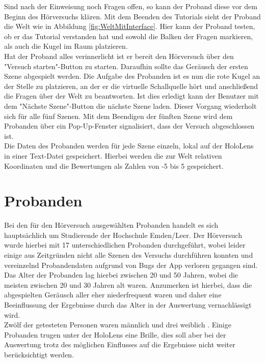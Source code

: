 Sind nach der Einweisung noch Fragen offen, so kann der Proband diese vor dem Beginn des Hörversuchs klären. Mit dem Beenden des Tutorials sieht der Proband die Welt wie in Abbildung \ref{fig:WeltMitInterface}. Hier kann der Proband testen, ob er das Tutorial verstanden hat und sowohl die Balken der Fragen markieren, als auch die Kugel im Raum platzieren.  \\
 
 Hat der Proband alles verinnerlicht ist er bereit den Hörversuch über den "Versuch starten"-Button zu starten. Daraufhin sollte das Geräusch der ersten Szene abgespielt werden. Die Aufgabe des Probanden ist es nun die rote Kugel an der Stelle zu platzieren, an der er die virtuelle Schallquelle hört und anschließend die Fragen über der Welt zu beantworten. Ist dies erledigt kann der Benutzer mit dem "Nächste Szene"-Button die nächste Szene laden. Dieser Vorgang wiederholt sich für alle fünf Szenen. Mit dem Beendigen der fünften Szene wird dem Probanden über ein Pop-Up-Fenster signalisiert, dass der Versuch abgeschlossen ist. \\
 
 Die Daten des Probanden werden für jede Szene  einzeln, lokal auf der HoloLens in einer Text-Datei gespeichert. Hierbei werden die zur Welt relativen Koordinaten und die Bewertungen als Zahlen von -5 bis 5 gespeichert. 
 
 
 \section{Probanden}
 
 Bei den für den Hörversuch ausgewählten Probanden handelt es sich hauptsächlich um Studierende der Hochschule Emden/Leer. Der Hörversuch wurde hierbei mit 17 unterschiedlichen Probanden durchgeführt, wobei leider einige aus Zeitgründen nicht alle Szenen des Versuchs durchführen konnten und vereinzelnd Probandendaten aufgrund von Bugs der App verloren gegangen sind. \\
 
  Das Alter der Probanden lag hierbei zwischen 20 und 50 Jahren, wobei die meisten zwischen 20 und 30 Jahren alt waren. Anzumerken ist hierbei, dass die abgespielten Geräusch aller eher niederfrequent waren und daher eine Beeinflussung der Ergebnisse durch das Alter in der Auswertung vernachlässigt wird. \\ 
  
 Zwölf der getesteten Personen waren männlich und drei  weiblich . Einige Probanden trugen unter der HoloLens eine Brille, dies soll aber bei der Auswertung trotz des möglichen Einflusses auf die Ergebnisse nicht weiter berücksichtigt werden. \\ 
 
